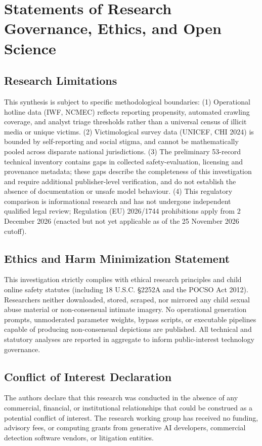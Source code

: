 \documentclass[10pt,a4paper]{article}
\begin{document}
\section{Statements of Research Governance, Ethics, and Open Science}

\subsection{Research Limitations}
This synthesis is subject to specific methodological boundaries: (1) Operational hotline data (IWF, NCMEC) reflects reporting propensity, automated crawling coverage, and analyst triage thresholds rather than a universal census of illicit media or unique victims. (2) Victimological survey data (UNICEF, CHI 2024) is bounded by self-reporting and social stigma, and cannot be mathematically pooled across disparate national jurisdictions. (3) The preliminary 53-record technical inventory contains gaps in collected safety-evaluation, licensing and provenance metadata; these gaps describe the completeness of this investigation and require additional publisher-level verification, and do not establish the absence of documentation or unsafe model behaviour. (4) This regulatory comparison is informational research and has not undergone independent qualified legal review; Regulation (EU) 2026/1744 prohibitions apply from 2 December 2026 (enacted but not yet applicable as of the 25 November 2026 cutoff).

\subsection{Ethics and Harm Minimization Statement}
This investigation strictly complies with ethical research principles and child online safety statutes (including 18 U.S.C. \S 2252A and the POCSO Act 2012). Researchers neither downloaded, stored, scraped, nor mirrored any child sexual abuse material or non-consensual intimate imagery. No operational generation prompts, unmoderated parameter weights, bypass scripts, or executable pipelines capable of producing non-consensual depictions are published. All technical and statutory analyses are reported in aggregate to inform public-interest technology governance.

\subsection{Conflict of Interest Declaration}
The authors declare that this research was conducted in the absence of any commercial, financial, or institutional relationships that could be construed as a potential conflict of interest. The research working group has received no funding, advisory fees, or computing grants from generative AI developers, commercial detection software vendors, or litigation entities.
\end{document}
